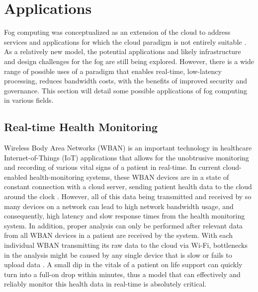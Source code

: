 \documentclass{article}
\begin{document}
\pagebreak

\section{Applications}

Fog computing was conceptualized as an extension of the cloud to address services and applications for which the cloud paradigm is not entirely suitable \cite{bessis2014big}. As a relatively new model, the potential applications and likely infrastructure and design challenges for the fog are still being explored. However, there is a wide range of possible uses of a paradigm that enables real-time, low-latency processing, reduces bandwidth costs, with the benefits of improved security and governance. This section will detail some possible applications of fog computing in various fields.

\subsection{Real-time Health Monitoring}
Wireless Body Area Networks (WBAN) is an important technology in healthcare Internet-of-Things (IoT) applications that allows for the unobtrusive monitoring and recording of various vital signs of a patient in real-time. In current cloud-enabled health-monitoring systems, these WBAN devices are in a state of constant connection with a cloud server, sending patient health data to the cloud around the clock \cite{gia2015fog}. However, all of this data being transmitted and received by so many devices on a network can lead to high network bandwidth usage, and consequently, high latency and slow response times from the health monitoring system. In addition, proper analysis can only be performed after relevant data from all WBAN devices in a patient are received by the system. With each individual WBAN transmitting its raw data to the cloud via Wi-Fi, bottlenecks in the analysis might be caused by any single device that is slow or fails to upload data \cite{gia2015fog}. A small dip in the vitals of a patient on life support can quickly turn into a full-on drop within minutes, thus a model that can effectively and reliably monitor this health data in real-time is absolutely critical.
\end{document}
